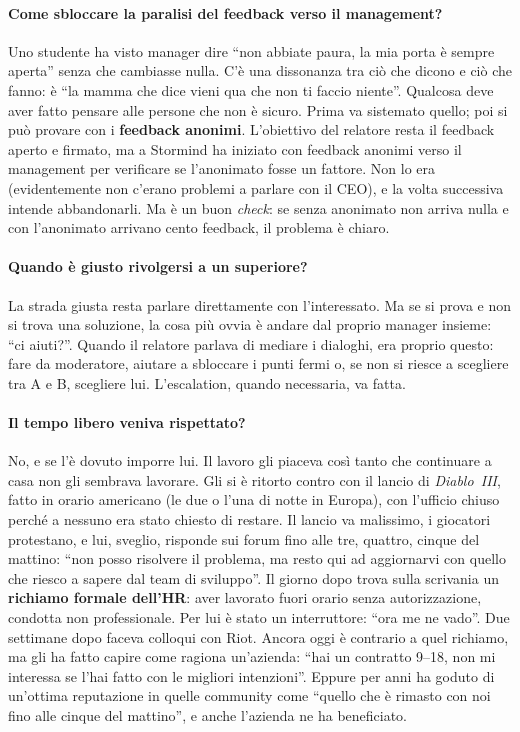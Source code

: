 \paragraph{Come sbloccare la paralisi del feedback verso il management?} Uno
studente ha visto manager dire ``non abbiate paura, la mia porta è sempre
aperta'' senza che cambiasse nulla. C'è una dissonanza tra ciò che dicono e
ciò che fanno: è ``la mamma che dice vieni qua che non ti faccio niente''.
Qualcosa deve aver fatto pensare alle persone che non è sicuro. Prima va
sistemato quello; poi si può provare con i \textbf{feedback anonimi}.
L'obiettivo del relatore resta il feedback aperto e firmato, ma a Stormind ha
iniziato con feedback anonimi verso il management per verificare se
l'anonimato fosse un fattore. Non lo era (evidentemente non c'erano problemi a
parlare con il CEO), e la volta successiva intende abbandonarli. Ma è un buon
\emph{check}: se senza anonimato non arriva nulla e con l'anonimato arrivano
cento feedback, il problema è chiaro.

\paragraph{Quando è giusto rivolgersi a un superiore?} La strada giusta resta
parlare direttamente con l'interessato. Ma se si prova e non si trova una
soluzione, la cosa più ovvia è andare dal proprio manager insieme: ``ci
aiuti?''. Quando il relatore parlava di mediare i dialoghi, era proprio questo:
fare da moderatore, aiutare a sbloccare i punti fermi o, se non si riesce a
scegliere tra A e B, scegliere lui. L'escalation, quando necessaria, va fatta.

\paragraph{Il tempo libero veniva rispettato?} No, e se l'è dovuto imporre
lui. Il lavoro gli piaceva così tanto che continuare a casa non gli sembrava
lavorare. Gli si è ritorto contro con il lancio di \emph{Diablo~III}, fatto in
orario americano (le due o l'una di notte in Europa), con l'ufficio chiuso
perché a nessuno era stato chiesto di restare. Il lancio va malissimo, i
giocatori protestano, e lui, sveglio, risponde sui forum fino alle tre, quattro,
cinque del mattino: ``non posso risolvere il problema, ma resto qui ad
aggiornarvi con quello che riesco a sapere dal team di sviluppo''. Il giorno
dopo trova sulla scrivania un \textbf{richiamo formale dell'HR}: aver lavorato
fuori orario senza autorizzazione, condotta non professionale. Per lui è stato
un interruttore: ``ora me ne vado''. Due settimane dopo faceva colloqui con
Riot. Ancora oggi è contrario a quel richiamo, ma gli ha fatto capire come
ragiona un'azienda: ``hai un contratto 9--18, non mi interessa se l'hai fatto
con le migliori intenzioni''. Eppure per anni ha goduto di un'ottima
reputazione in quelle community come ``quello che è rimasto con noi fino alle
cinque del mattino'', e anche l'azienda ne ha beneficiato.

